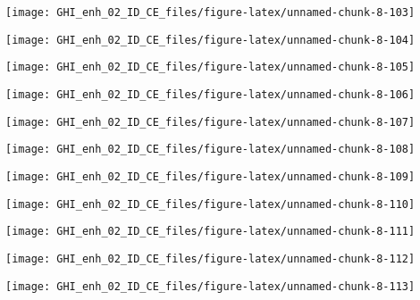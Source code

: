 \documentclass[
  10pt,
  a4paper,oneside]{article}
\begin{document}
\begin{center}\texttt{[image: GHI\_enh\_02\_ID\_CE\_files/figure-latex/unnamed-chunk-8-103]} \end{center}

\begin{center}\texttt{[image: GHI\_enh\_02\_ID\_CE\_files/figure-latex/unnamed-chunk-8-104]} \end{center}

\begin{center}\texttt{[image: GHI\_enh\_02\_ID\_CE\_files/figure-latex/unnamed-chunk-8-105]} \end{center}

\begin{center}\texttt{[image: GHI\_enh\_02\_ID\_CE\_files/figure-latex/unnamed-chunk-8-106]} \end{center}

\begin{center}\texttt{[image: GHI\_enh\_02\_ID\_CE\_files/figure-latex/unnamed-chunk-8-107]} \end{center}

\begin{center}\texttt{[image: GHI\_enh\_02\_ID\_CE\_files/figure-latex/unnamed-chunk-8-108]} \end{center}

\begin{center}\texttt{[image: GHI\_enh\_02\_ID\_CE\_files/figure-latex/unnamed-chunk-8-109]} \end{center}

\begin{center}\texttt{[image: GHI\_enh\_02\_ID\_CE\_files/figure-latex/unnamed-chunk-8-110]} \end{center}

\begin{center}\texttt{[image: GHI\_enh\_02\_ID\_CE\_files/figure-latex/unnamed-chunk-8-111]} \end{center}

\begin{center}\texttt{[image: GHI\_enh\_02\_ID\_CE\_files/figure-latex/unnamed-chunk-8-112]} \end{center}

\begin{center}\texttt{[image: GHI\_enh\_02\_ID\_CE\_files/figure-latex/unnamed-chunk-8-113]} \end{center}
\end{document}
